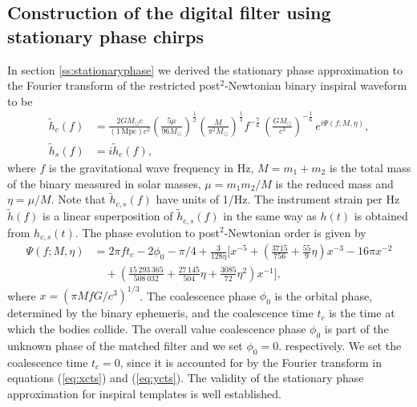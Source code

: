 \subsection{Construction of the digital filter using stationary phase chirps}
\label{ss:digitalfilter}

In section \ref{ss:stationaryphase} we derived the stationary phase
approximation to the Fourier transform of the restricted post$^2$-Newtonian
binary inspiral waveform to be
\begin{align}
\label{eq:spcos}
\tilde{h}_c(f)&=\frac{2GM_\odot c}{(1\,\mathrm{Mpc})c^2}
\left(\frac{5\mu}{96M_\odot}\right)^\frac{1}{2}
\left(\frac{M}{\pi^2M_\odot}\right)^\frac{1}{3}
f^{-\frac{7}{6}}\, \left( \frac{GM_\odot}{c^3} \right)^{-\frac{1}{6}}\,
e^{i\Psi(f;M,\eta)},\\
\tilde{h}_s(f)&=i\tilde{h}_c(f),
\label{eq:hsorthog}
\end{align}
where $f$ is the gravitational wave frequency in Hz, $M = m_1+m_2$ 
is the total mass of the binary measured in solar masses, $\mu = m_1 m_2 / M$
is the reduced mass and $\eta = \mu/M$.  Note that $\tilde{h}_{c,s}(f)$ have
units of 1/Hz.  The instrument strain per Hz $\tilde{h}(f)$ is 
a linear superposition of $\tilde{h}_{c,s}(f)$ in the same way as
$h(t)$ is obtained from $h_{c,s}(t)$. The phase evolution to
post$^2$-Newtonian order is given by
\begin{equation}
\begin{split}
\Psi(f;M,\eta) &= 2\pi ft_c-2\phi_0-\pi/4+\frac{3}{128\eta}\biggl[x^{-5}+
\left(\frac{3715}{756}+\frac{55}{9}\eta\right)x^{-3}
-16\pi x^{-2} \\
&\quad +\left(\frac{15\,293\,365}{508\,032}+\frac{27\,145}{504}\eta
+\frac{3085}{72}\eta^2\right)x^{-1}\biggr],
\label{eq:spphase}
\end{split}
\end{equation}
where $x=(\pi M f G/c^3)^{1/3}$. The coalescence phase $\phi_0$ is the orbital
phase, determined by the binary ephemeris, and the coalescence time $t_c$ is
the time at which the bodies collide. The overall value coalescence phase
$\phi_0$ is part of the unknown phase of the matched filter and we set
$\phi_0=0$.  respectively.  We set the coalescence time $t_c = 0$, since it is
accounted for by the Fourier transform in equations (\ref{eq:xcts}) and
(\ref{eq:ycts}).  The validity of the stationary phase approximation for
inspiral templates is well established\cite{Droz:1999qx}.

